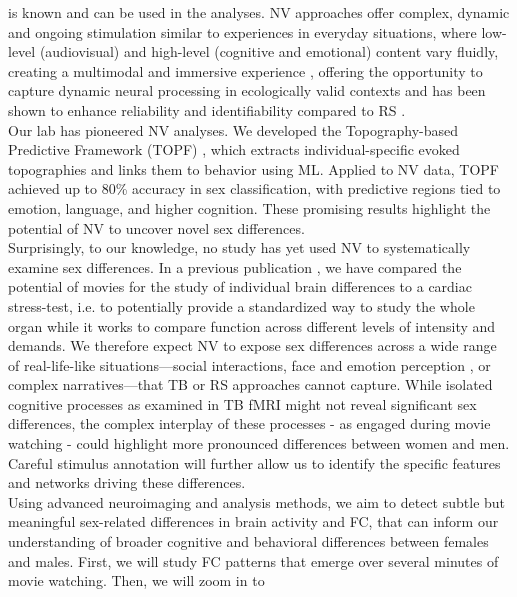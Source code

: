 \documentclass[11pt,a4paper]{article}
\begin{document}
is known and can be used in the analyses.
NV approaches offer complex, dynamic and ongoing stimulation similar 
to experiences in everyday situations, where low-level (audiovisual) and high-level (cognitive and emotional) 
content vary fluidly, creating a multimodal and immersive experience 
\parencite{sonkusareNaturalisticStimuliNeuroscience2019}, offering the 
opportunity to capture dynamic neural processing in ecologically valid contexts 
\parencite{vanderwalMoviesMagnetNaturalistic2019} and has been shown to enhance reliability and 
identifiability compared to RS \parencite{krollNaturalisticViewingIncreases2023}.\\
Our lab has pioneered NV analyses. We developed the Topography-based Predictive Framework (TOPF) 
\parencite{liTopographybasedPredictiveFramework2023a}, which extracts individual-specific evoked 
topographies and links them to behavior using ML. 
Applied to NV data, TOPF achieved up to 80\% accuracy in 
sex classification, with predictive regions tied to emotion, language, and higher cognition. 
These promising results highlight the potential of NV to uncover novel sex differences.\\
Surprisingly, to our knowledge, no study has yet used NV to systematically examine sex differences. 
In a previous publication \parencite{eickhoffClinicalApplicationsMovie2020a}, we have compared the potential of 
movies for the study of 
individual brain differences to a cardiac stress-test, 
i.e. to potentially provide a standardized way to study the whole organ while it works to compare function 
across different levels of intensity and demands. 
We therefore expect NV to expose sex differences across a wide range of real-life-like situations—social interactions, 
face and emotion perception \parencite{sonkusareNaturalisticStimuliNeuroscience2019}, 
or complex narratives—that TB or RS approaches cannot capture. 
While isolated cognitive processes as examined in TB fMRI might not reveal 
significant sex differences, the complex interplay of these processes - as engaged during movie watching - could 
highlight more pronounced differences between women and men. 
Careful stimulus annotation will further allow us to identify the specific features and networks driving these differences.\\
Using advanced neuroimaging and analysis methods, we aim to detect subtle but meaningful sex-related differences 
in brain activity and FC, that can inform our understanding of 
broader cognitive and behavioral differences between females and males. 
First, we will study FC patterns that emerge over several minutes of movie watching. Then, we will zoom in to
\end{document}
